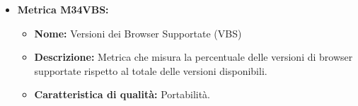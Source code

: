 \begin{itemize}
            \item \hypertarget{item:M34VBS}{\textbf{Metrica M34VBS:}}
            \begin{minipage}[t]{0.9\textwidth}
                    \begin{itemize}
                        \item \textbf{Nome:} Versioni dei Browser Supportate (VBS)
                        \item \textbf{Descrizione:} Metrica che misura la percentuale delle versioni di browser supportate rispetto al totale delle versioni disponibili.
                        \item \textbf{Caratteristica di qualità:} Portabilità.
                      \end{itemize}
                    \end{minipage}

\end{itemize}